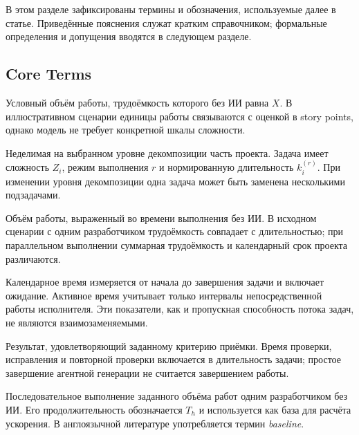 \label{sec:terms}

В этом разделе зафиксированы термины и обозначения, используемые далее в
статье. Приведённые пояснения служат кратким справочником; формальные
определения и допущения вводятся в следующем разделе.

\subsection{Core Terms}

\begin{description}[style=nextline]
  \item[Единица работы] Условный объём работы, трудоёмкость которого без ИИ
  равна $X$. В иллюстративном сценарии единицы работы связываются с оценкой в
  story points, однако модель не требует конкретной шкалы сложности.

  \item[Задача] Неделимая на выбранном уровне декомпозиции часть проекта.
  Задача имеет сложность $Z_i$, режим выполнения $r$ и нормированную длительность
  $k_i^{(r)}$. При изменении уровня декомпозиции одна задача может быть
  заменена несколькими подзадачами.

  \item[Трудоёмкость] Объём работы, выраженный во времени выполнения без ИИ.
  В исходном сценарии с одним разработчиком трудоёмкость совпадает с
  длительностью; при параллельном выполнении суммарная трудоёмкость и
  календарный срок проекта различаются.

  \item[Календарное и активное время] Календарное время измеряется от начала
  до завершения задачи и включает ожидание. Активное время учитывает только
  интервалы непосредственной работы исполнителя. Эти показатели, как и
  пропускная способность потока задач, не являются взаимозаменяемыми.

  \item[Принятый результат] Результат, удовлетворяющий заданному критерию
  приёмки. Время проверки, исправления и повторной проверки включается в
  длительность задачи; простое завершение агентной генерации не считается
  завершением работы.

  \item[Исходный сценарий] Последовательное выполнение заданного объёма работ
  одним разработчиком без ИИ. Его продолжительность обозначается $T_h$ и
  используется как база для расчёта ускорения. В англоязычной литературе
  употребляется термин \emph{baseline}.


\end{description}
